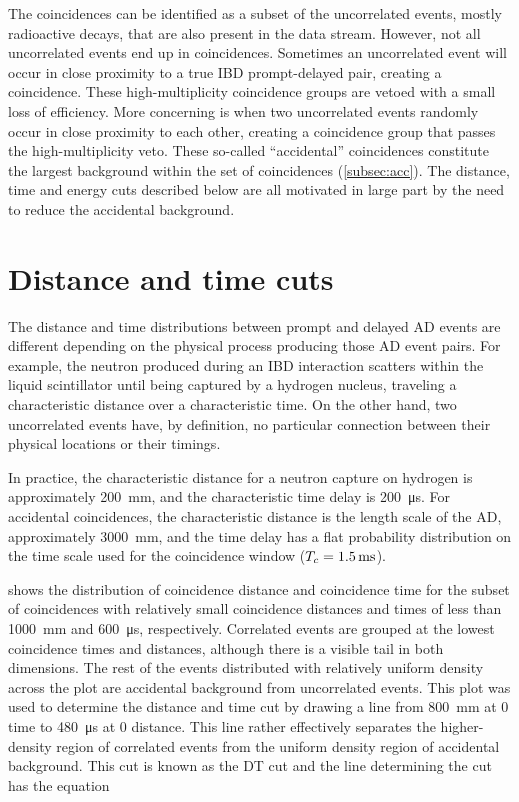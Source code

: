The  coincidences can be identified as a subset
of the uncorrelated events, mostly radioactive decays,
that are also present in the data stream.
However, not all uncorrelated events end up in  coincidences.
Sometimes an uncorrelated event will occur in close proximity to
a true IBD prompt-delayed pair, creating a  coincidence.
These high-multiplicity coincidence groups are vetoed
with a small loss of efficiency.
More concerning is when two uncorrelated events
randomly occur in close proximity to each other,
creating a  coincidence group that passes the high-multiplicity veto.
These so-called ``accidental'' coincidences
constitute the largest background within the set of  coincidences
(\cref{subsec:acc}).
The distance, time and energy cuts described below
are all motivated in large part by the need to reduce the accidental background.

\section{Distance and time cuts}

The distance and time distributions between prompt and delayed AD events
are different depending on the physical process producing those AD event pairs.
For example, the neutron produced during an IBD interaction
scatters within the liquid scintillator until being captured
by a hydrogen nucleus,
traveling a characteristic distance over a characteristic time.
On the other hand, two uncorrelated events have, by definition,
no particular connection between their physical locations
or their timings.

In practice, the characteristic distance for a neutron capture on hydrogen
is approximately \SI{200}{\milli\meter},
and the characteristic time delay is \SI{200}{\micro\second}.
For accidental coincidences, the characteristic distance is
the length scale of the AD, approximately \SI{3000}{\milli\meter},
and the time delay has a flat probability distribution
on the time scale used for the coincidence window ($T_c = \SI{1.5}{\milli\second}$).


 shows the distribution of
coincidence distance and coincidence time
for the subset of  coincidences with
relatively small coincidence distances and times
of less than \SI{1000}{\milli\meter} and \SI{600}{\micro\second},
respectively.
Correlated events are grouped at the lowest
coincidence times and distances,
although there is a visible tail in both dimensions.
The rest of the events distributed with relatively uniform density
across the plot are accidental background from uncorrelated events.
This plot was used to determine the distance and time cut
by drawing a line from \SI{800}{\milli\meter} at $0$ time
to \SI{480}{\micro\second} at $0$ distance.
This line rather effectively separates the higher-density region
of correlated events from the uniform density region of accidental background.
This cut is known as the DT cut and the line determining the cut has the equation


